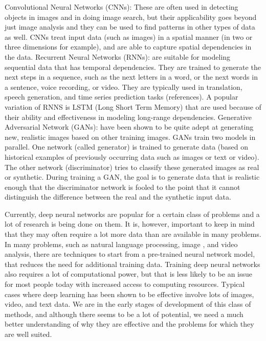 \documentclass[]{krantz}
\begin{document}
Convolutional Neural Networks (CNNs): These are often used in detecting
objects in images and in doing image search, but their applicability
goes beyond just image analysis and they can be used to find patterns in
other types of data as well. CNNs treat input data (such as images) in a
spatial manner (in two or three dimensions for example), and are able to
capture spatial dependencies in the data. Recurrent Neural Networks
(RNNs): are suitable for modeling sequential data that has temporal
dependencies. They are trained to generate the next steps in a sequence,
such as the next letters in a word, or the next words in a sentence,
voice recording, or video. They are typically used in translation,
speech generation, and time series prediction tasks (references). A
popular variation of RNNS is LSTM (Long Short Term Memory) that are used
because of their ability and effectiveness in modeling long-range
dependencies. Generative Adversarial Network (GANs): have been shown to
be quite adept at generating new, realistic images based on other
training images. GANs train two models in parallel. One network (called
generator) is trained to generate data (based on historical examples of
previously occurring data such as images or text or video). The other
network (discriminator) tries to classify these generated images as real
or synthetic. During training a GAN, the goal is to generate data that
is realistic enough that the discriminator network is fooled to the
point that it cannot distinguish the difference between the real and the
synthetic input data.

Currently, deep neural networks are popular for a certain class of
problems and a lot of research is being done on them. It is, however,
important to keep in mind that they may often require a lot more data
than are available in many problems. In many problems, such as natural
language processing, image , and video analysis, there are techniques to
start from a pre-trained neural network model, that reduces the need for
additional training data. Training deep neural networks also requires a
lot of computational power, but that is less likely to be an issue for
most people today with increased access to computing resources. Typical
cases where deep learning has been shown to be effective involve lots of
images, video, and text data. We are in the early stages of development
of this class of methods, and although there seems to be a lot of
potential, we need a much better understanding of why they are effective
and the problems for which they are well suited.
\end{document}
